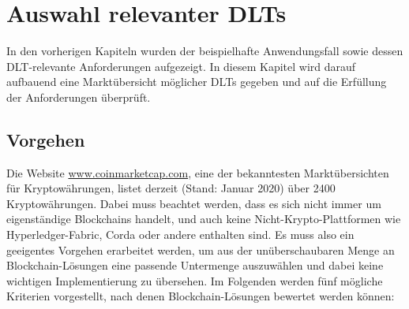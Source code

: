 \chapter{Auswahl relevanter DLTs}
\label{ch:dlt_selection}
In den vorherigen Kapiteln wurden der beispielhafte Anwendungsfall sowie dessen \ac{DLT}-relevante Anforderungen aufgezeigt. In diesem Kapitel wird darauf aufbauend eine Marktübersicht möglicher \ac{DLT}s gegeben und auf die Erfüllung der Anforderungen überprüft.

%
%
\section{Vorgehen}
\label{sec:dlt_selection:approach}
Die Website \url{www.coinmarketcap.com}, eine der bekanntesten Marktübersichten für Kryptowährungen, listet derzeit (Stand: Januar 2020) über 2400 Kryptowährungen. Dabei muss beachtet werden, dass es sich nicht immer um eigenständige Blockchains handelt, und auch keine Nicht-Krypto-Plattformen wie Hyperledger-Fabric, Corda oder andere enthalten sind. Es muss also ein geeigentes Vorgehen erarbeitet werden, um aus der unüberschaubaren Menge an Blockchain-Lösungen eine passende Untermenge auszuwählen und dabei keine wichtigen Implementierung zu übersehen. Im Folgenden werden fünf mögliche Kriterien vorgestellt, nach denen Blockchain-Lösungen bewertet werden können:
